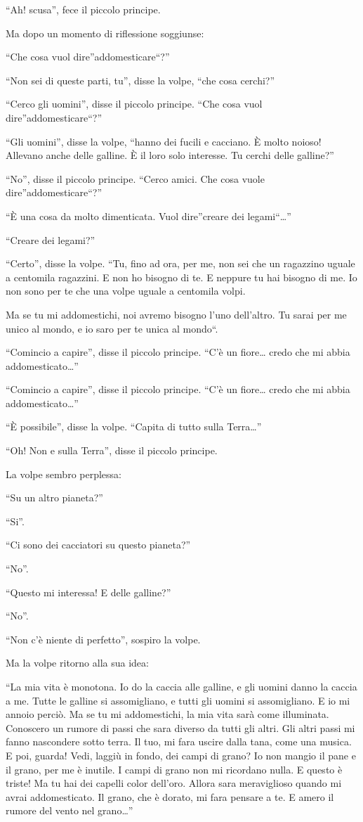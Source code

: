 \documentclass[11pt]{scrbook}
\begin{document}
``Ah! scusa'', fece il piccolo principe.

Ma dopo un momento di riflessione soggiunse:

``Che cosa vuol dire''addomesticare``?''

``Non sei di queste parti, tu'', disse la volpe, ``che cosa cerchi?''

``Cerco gli uomini'', disse il piccolo principe. ``Che cosa vuol
dire''addomesticare``?''

``Gli uomini'', disse la volpe, ``hanno dei fucili e cacciano. È molto
noioso! Allevano anche delle galline. È il loro solo interesse. Tu
cerchi delle galline?''

``No'', disse il piccolo principe. ``Cerco amici. Che cosa vuole
dire''addomesticare``?''

``È una cosa da molto dimenticata. Vuol dire''creare dei
legami``\ldots{}''

``Creare dei legami?''

``Certo'', disse la volpe. ``Tu, fino ad ora, per me, non sei che un
ragazzino uguale a centomila ragazzini. E non ho bisogno di te. E
neppure tu hai bisogno di me. Io non sono per te che una volpe uguale a
centomila volpi.

Ma se tu mi addomestichi, noi avremo bisogno l'uno dell'altro. Tu sarai
per me unico al mondo, e io saro per te unica al mondo``.

``Comincio a capire'', disse il piccolo principe. ``C'è un fiore\ldots{}
credo che mi abbia addomesticato\ldots{}''

``Comincio a capire'', disse il piccolo principe. ``C'è un fiore\ldots{}
credo che mi abbia addomesticato\ldots{}''

``È possibile'', disse la volpe. ``Capita di tutto sulla Terra\ldots{}''

``Oh! Non e sulla Terra'', disse il piccolo principe.

La volpe sembro perplessa:

``Su un altro pianeta?''

``Si''.

``Ci sono dei cacciatori su questo pianeta?''

``No''.

``Questo mi interessa! E delle galline?''

``No''.

``Non c'è niente di perfetto'', sospiro la volpe.

Ma la volpe ritorno alla sua idea:

``La mia vita è monotona. Io do la caccia alle galline, e gli uomini
danno la caccia a me. Tutte le galline si assomigliano, e tutti gli
uomini si assomigliano. E io mi annoio perciò. Ma se tu mi addomestichi,
la mia vita sarà come illuminata. Conoscero un rumore di passi che sara
diverso da tutti gli altri. Gli altri passi mi fanno nascondere sotto
terra. Il tuo, mi fara uscire dalla tana, come una musica. E poi,
guarda! Vedi, laggiù in fondo, dei campi di grano? Io non mangio il pane
e il grano, per me è inutile. I campi di grano non mi ricordano nulla. E
questo è triste! Ma tu hai dei capelli color dell'oro. Allora sara
meraviglioso quando mi avrai addomesticato. Il grano, che è dorato, mi
fara pensare a te. E amero il rumore del vento nel grano\ldots{}''
\end{document}
